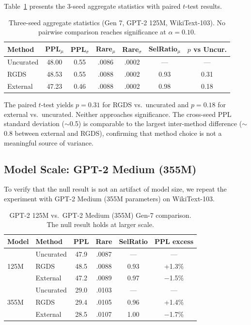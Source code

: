 \documentclass[11pt]{article}
\begin{document}
Table~\ref{tab:3seed_agg} presents the 3-seed aggregate statistics with paired $t$-test results.

\begin{table}[h]
\centering
\caption{Three-seed aggregate statistics (Gen 7, GPT-2 125M, WikiText-103). No pairwise comparison reaches significance at $\alpha = 0.10$.}
\label{tab:3seed_agg}
\small
\begin{tabular}{l cc cc c c}
\toprule
\textbf{Method} & \textbf{PPL$_{\mu}$} & \textbf{PPL$_{\sigma}$} & \textbf{Rare$_{\mu}$} & \textbf{Rare$_{\sigma}$} & \textbf{SelRatio$_{\mu}$} & \textbf{$p$ vs Uncur.} \\
\midrule
Uncurated & 48.00 & 0.55 & .0086 & .0002 & --- & --- \\
RGDS      & 48.53 & 0.55 & .0088 & .0002 & 0.93 & 0.31 \\
External  & 47.23 & 0.46 & .0088 & .0002 & 0.98 & 0.18 \\
\bottomrule
\end{tabular}
\end{table}

The paired $t$-test yields $p = 0.31$ for RGDS vs.\ uncurated and $p = 0.18$ for external vs.\ uncurated. Neither approaches significance. The cross-seed PPL standard deviation ($\sim$0.5) is comparable to the largest inter-method difference ($\sim$0.8 between external and RGDS), confirming that method choice is not a meaningful source of variance.

\subsection{Model Scale: GPT-2 Medium (355M)}
\label{sec:scale}

To verify that the null result is not an artifact of model size, we repeat the experiment with GPT-2 Medium (355M parameters) on WikiText-103.

\begin{table}[h]
\centering
\caption{GPT-2 125M vs.\ GPT-2 Medium (355M) Gen-7 comparison. The null result holds at larger scale.}
\label{tab:scale}
\small
\begin{tabular}{ll cccc}
\toprule
\textbf{Model} & \textbf{Method} & \textbf{PPL} & \textbf{Rare} & \textbf{SelRatio} & \textbf{PPL excess} \\
\midrule
\multirow{3}{*}{125M} & Uncurated & 47.9 & .0087 & --- & --- \\
                       & RGDS      & 48.5 & .0088 & 0.93 & +1.3\% \\
                       & External  & 47.2 & .0089 & 0.97 & $-$1.5\% \\
\midrule
\multirow{3}{*}{355M} & Uncurated & 29.0 & .0103 & --- & --- \\
                       & RGDS      & 29.4 & .0105 & 0.96 & +1.4\% \\
                       & External  & 28.5 & .0107 & 1.00 & $-$1.7\% \\
\bottomrule
\end{tabular}
\end{table}
\end{document}
